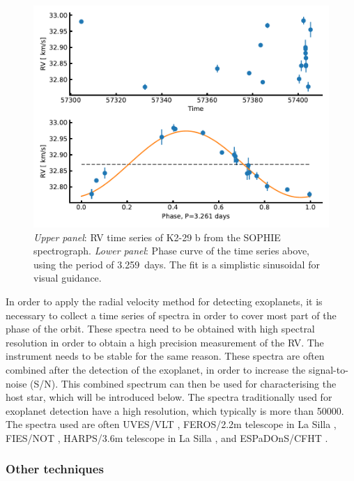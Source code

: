 \begin{figure}[htpb!]
    \centering
    \includegraphics[width=1.0\linewidth]{figures/RVmethod.pdf}
    \caption{\emph{Upper panel}: RV time series of K2-29 b from the SOPHIE spectrograph.
             \emph{Lower panel}: Phase curve of the time series above, using the period of
             \SI{3.259}{days}. The fit is a simplistic sinusoidal for visual guidance.}
    \label{fig:rvmethod}
\end{figure}

In order to apply the radial velocity method for detecting exoplanets, it is necessary to collect a
time series of spectra in order to cover most part of the phase of the orbit. These spectra need to
be obtained with high spectral resolution in order to obtain a high precision measurement of the RV.
The instrument needs to be stable for the same reason. These spectra are often combined after the
detection of the exoplanet, in order to increase the signal-to-noise (S/N). This combined spectrum
can then be used for characterising the host star, which will be introduced below. The spectra
traditionally used for exoplanet detection have a high resolution, which typically is more than
\num{50000}. The spectra used are often UVES/VLT \citep{UVES}, FEROS/2.2m telescope in La Silla
\citep{FEROS}, FIES/NOT \citep{FIES}, HARPS/3.6m telescope in La Silla \citep{HARPS}, and
ESPaDOnS/CFHT \citep{ESPADONS}.


\subsubsection{Other techniques}


